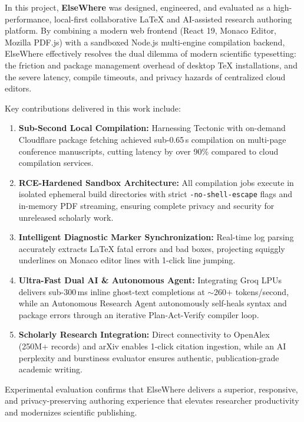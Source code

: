 \documentclass[12pt,a4paper,twoside]{article}
\newcommand{\emptypara}{\mbox{}\par}
\newcommand{\code}[1]{\texttt{#1}}
\begin{document}
\begin{sloppypar}
\noindent In this project, \textbf{ElseWhere} was designed, engineered, and evaluated as a high-performance, local-first collaborative \LaTeX{} and AI-assisted research authoring platform. By combining a modern web frontend (React 19, Monaco Editor, Mozilla PDF.js) with a sandboxed Node.js multi-engine compilation backend, ElseWhere effectively resolves the dual dilemma of modern scientific typesetting: the friction and package management overhead of desktop \TeX{} installations, and the severe latency, compile timeouts, and privacy hazards of centralized cloud editors.\par

\emptypara
\noindent Key contributions delivered in this work include:
\begin{enumerate}[leftmargin=0.5in,labelindent=0pt,labelwidth=0.25in,labelsep=0pt,
                  itemsep=2pt,parsep=0pt,topsep=2pt,partopsep=0pt,align=left]
    \item \textbf{Sub-Second Local Compilation:} Harnessing Tectonic with on-demand Cloudflare package fetching achieved sub-0.65\,s compilation on multi-page conference manuscripts, cutting latency by over 90\% compared to cloud compilation services.
    \item \textbf{RCE-Hardened Sandbox Architecture:} All compilation jobs execute in isolated ephemeral build directories with strict \code{-no-shell-escape} flags and in-memory PDF streaming, ensuring complete privacy and security for unreleased scholarly work.
    \item \textbf{Intelligent Diagnostic Marker Synchronization:} Real-time log parsing accurately extracts \LaTeX{} fatal errors and bad boxes, projecting squiggly underlines on Monaco editor lines with 1-click line jumping.
    \item \textbf{Ultra-Fast Dual AI \& Autonomous Agent:} Integrating Groq LPUs delivers sub-300\,ms inline ghost-text completions at $\sim$260+ tokens/second, while an Autonomous Research Agent autonomously self-heals syntax and package errors through an iterative Plan-Act-Verify compiler loop.
    \item \textbf{Scholarly Research Integration:} Direct connectivity to OpenAlex (250M+ records) and arXiv enables 1-click citation ingestion, while an AI perplexity and burstiness evaluator ensures authentic, publication-grade academic writing.
\end{enumerate}

\emptypara
\noindent Experimental evaluation confirms that ElseWhere delivers a superior, responsive, and privacy-preserving authoring experience that elevates researcher productivity and modernizes scientific publishing.\par
\end{sloppypar}
\end{document}
